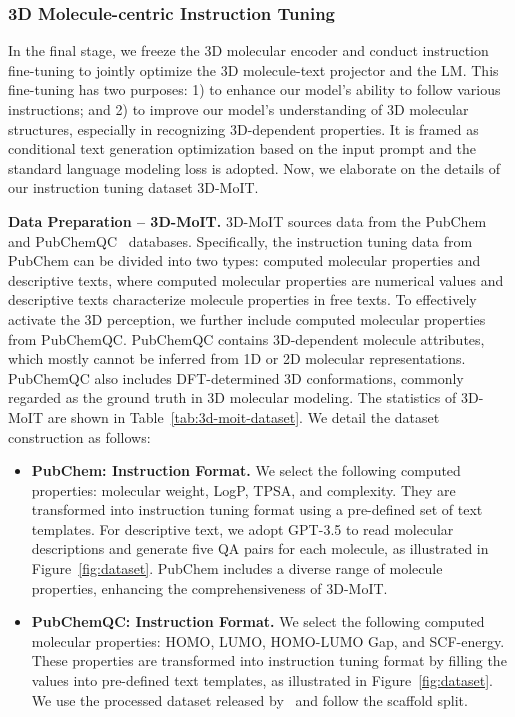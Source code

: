 \subsubsection{3D Molecule-centric Instruction Tuning}\label{sec:instruct-tuning}
In the final stage, we freeze the 3D molecular encoder and conduct instruction fine-tuning to jointly optimize the 3D molecule-text projector and the LM. 
This fine-tuning has two purposes: 1) to enhance our model's ability to follow various instructions; and 2) to improve our model's understanding of 3D molecular structures, especially in recognizing 3D-dependent properties. 
It is framed as conditional text generation optimization based on the input prompt and the standard language modeling loss is adopted.
Now, we elaborate on the details of our instruction tuning dataset 3D-MoIT.

\textbf{Data Preparation -- 3D-MoIT.} 3D-MoIT sources data from the PubChem~\citep{pubchem} and PubChemQC~\citep{pubchemqc} databases. 
Specifically, the instruction tuning data from PubChem can be divided into two types: computed molecular properties and descriptive texts, where computed molecular properties are numerical values and descriptive texts characterize molecule properties in free texts. To effectively activate the 3D perception, we further include computed molecular properties from PubChemQC. PubChemQC contains 3D-dependent molecule attributes, which mostly cannot be inferred from 1D or 2D molecular representations. PubChemQC also includes DFT-determined 3D conformations, commonly regarded as the ground truth in 3D molecular modeling. The statistics of 3D-MoIT are shown in Table~\ref{tab:3d-moit-dataset}. We detail the dataset construction as follows:
\begin{itemize}[leftmargin=*]
    \item \textbf{PubChem: Instruction Format.} We select the following computed properties: molecular weight, LogP, TPSA, and complexity. They are transformed into instruction tuning format using a pre-defined set of text templates. For descriptive text, we adopt GPT-3.5 to read molecular descriptions and generate five QA pairs for each molecule, as illustrated in Figure~\ref{fig:dataset}. PubChem includes a diverse range of molecule properties, enhancing the comprehensiveness of 3D-MoIT.
    \item \textbf{PubChemQC: Instruction Format.} We select the following computed molecular properties: HOMO, LUMO, HOMO-LUMO Gap, and SCF-energy. These properties are transformed into instruction tuning format by filling the values into pre-defined text templates, as illustrated in Figure~\ref{fig:dataset}. We use the processed dataset released by~\citep{molecule3d} and follow the scaffold split.
\end{itemize}

